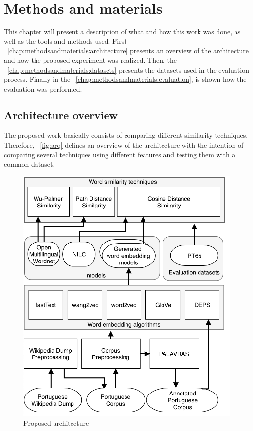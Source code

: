 \section{Methods and materials}\label{chap:methodsandmaterials}

This chapter will present a description of what and how this work was done, as well as the tools and methods used. First ~\autoref{chap:methodsandmaterials:architecture} presents an overview of the architecture and how the proposed experiment was realized. Then, the ~\autoref{chap:methodsandmaterials:datasets} presents the datasets used in the evaluation process. Finally in the 
~\autoref{chap:methodsandmaterials:evaluation}, is shown how the evaluation was performed.

\subsection{Architecture overview}\label{chap:methodsandmaterials:architecture}

The proposed work basically consists of comparing different similarity techniques. Therefore, ~\autoref{fig:arq} defines an overview of the architecture with the intention of comparing several techniques using different features and testing them with a common dataset.

\begin{figure}[h]
	\caption{Proposed architecture}
	\label{fig:arq}
	\centering%
	\begin{minipage}{.8\textwidth}
		\includegraphics[width=\textwidth]{arq.png}
	\end{minipage}
\end{figure}

